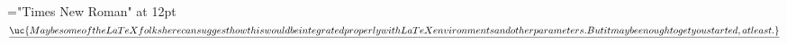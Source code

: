 \font\uc="Times New Roman" at 12pt
$\underline{\uc{Maybe some of the LaTeX folks here can suggest how this would be integrated properly with LaTeX environments and other parameters. But it may be enough to get you started, at least. }
}$

\bye
